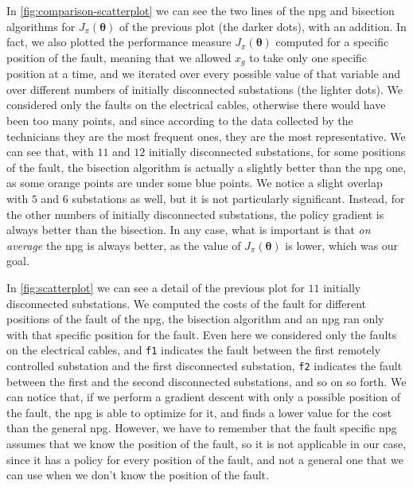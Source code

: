 In \autoref{fig:comparison-scatterplot} we can see the two lines of the \acrshort{npg} and bisection algorithms for $J_\pi(\boldsymbol \theta)$ of the previous plot (the darker dots), with an addition. In fact, we also plotted the performance measure $J_\pi(\boldsymbol \theta)$ computed for a specific position of the fault,
meaning that we allowed $x_g$ to take only one specific position at a time, and we iterated over every possible value of that variable and over different numbers of initially disconnected substations (the lighter dots). We considered only the faults on the electrical cables, otherwise there would have been too many points, and since according to the data collected by the technicians they are the most frequent ones, they are the most representative. We can see that, with $11$ and $12$ initially disconnected substations, for some positions of the fault, the bisection algorithm is actually a slightly better than the \acrshort{npg} one, as some orange points are under some blue points. We notice a slight overlap with $5$ and $6$ substations as well, but it is not particularly significant.
Instead, for the other numbers of initially disconnected substations, the policy gradient is always better than the bisection. In any case, what is important is that \emph{on average} the \acrshort{npg} is always better, as the value of $J_\pi(\boldsymbol \theta)$ is lower, which was our goal.

In \autoref{fig:scatterplot} we can see a detail of the previous plot for $11$ initially disconnected substations. We computed the costs of the fault for different positions of the fault of the \acrshort{npg}, the bisection algorithm and an \acrshort{npg} ran only with that specific position for the fault. Even here we considered only the faults on the electrical cables, and \texttt{f1} indicates the fault between the first remotely controlled substation and the first disconnected substation, \texttt{f2} indicates the fault between the first and the second disconnected substations, and so on so forth.
We can notice that, if we perform a gradient descent with only a possible position of the fault, the \acrshort{npg} is able to optimize for it, and finds a lower value for the cost than the general \acrshort{npg}.
However, we have to remember that the fault specific \acrshort{npg} assumes that we know the position of the fault, so it is not applicable in our case, since it has a policy for every position of the fault, and not a general one that we can use when we don't know the position of the fault.